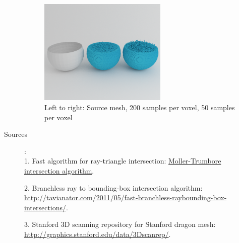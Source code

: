 \documentclass {article}
\begin{document}
\begin{description}
		
		\begin{figure}
			\begin{center}
				\includegraphics[width=0.6\textwidth]{../data/renders/bowl}
				\caption{Left to right: Source mesh, 200 samples per voxel, 50 samples per voxel}
			\end{center}
		\end{figure}
		
		\newpage

		\item[Sources]:\\
		
		1. Fast algorithm for ray-triangle intersection: \href{http://en.wikipedia.org/wiki/M%C3%B6ller%E2%80%93Trumbore_intersection_algorithm}{Moller-Trumbore intersection algorithm}. 
		
		2. Branchless ray to bounding-box intersection algorithm: \href{http://tavianator.com/2011/05/fast-branchless-raybounding-box-intersections/}{http://tavianator.com/2011/05/fast-branchless-raybounding-box-intersections/}.  
		
		3. Stanford 3D scanning repository for Stanford dragon mesh: \href{http://graphics.stanford.edu/data/3Dscanrep/}{http://graphics.stanford.edu/data/3Dscanrep/}. 
		
	\end{description}
	
\end{document}

